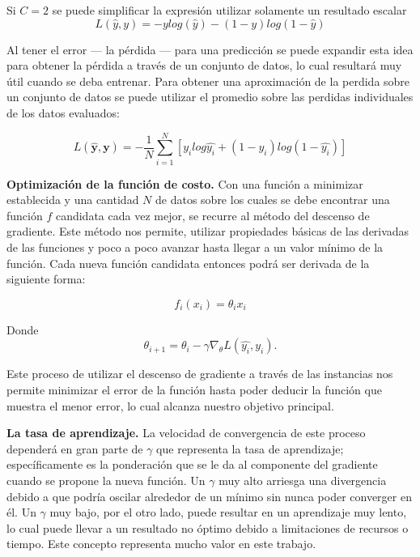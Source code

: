 Si $C = 2$ se puede simplificar la expresión utilizar solamente un resultado escalar
\begin{equation}
\label{eq:bincrossentropy}
L(\hat{y}, y) = - y log \left( \hat{y} \right) - \left(1 - y\right) log \left( 1 - \hat{y} \right)
\end{equation}

Al tener el error --- la pérdida --- para una predicción se puede expandir esta idea para obtener la pérdida a través de un conjunto de datos, lo cual resultará muy útil cuando se deba entrenar. Para obtener una aproximación de la perdida sobre un conjunto de datos se puede utilizar el promedio sobre las perdidas individuales de los datos evaluados:

\[ L(\mathbf{\hat{y}}, \mathbf{y}) = - \frac{1}{N} \sum_{i = 1}^{N} [y_i log\hat{y_i} + (1 - y_i)log(1 - \hat{y_i})] \]

\textbf{Optimización de la función de costo.} Con una función a minimizar establecida y una cantidad $N$ de datos sobre los cuales se debe encontrar una función $f$ candidata cada vez mejor, se recurre al método del descenso de gradiente. Este método nos permite, utilizar propiedades básicas de las derivadas de las funciones y poco a poco avanzar hasta llegar a un valor mínimo de la función. Cada nueva función candidata entonces podrá ser derivada de la siguiente forma:

\[ f_i(x_i) = \theta_i x_i \]

Donde
\begin{equation}
\label{eq:sgdupdate}
\theta_{i + 1} = \theta_{i} - \gamma \nabla_{\theta} L(\hat{y_i}, y_i).
\end{equation}

Este proceso de utilizar el descenso de gradiente a través de las instancias nos permite  minimizar el error de la función hasta poder deducir la función que muestra el menor error, lo cual alcanza nuestro objetivo principal.

\textbf{La \gls{tasa de aprendizaje}.} La velocidad de convergencia de este proceso dependerá en gran parte de $\gamma$ que representa la tasa de aprendizaje; específicamente es la ponderación que se le da al componente del gradiente cuando se propone la nueva función. Un $\gamma$ muy alto arriesga una divergencia debido a que podría oscilar alrededor de un mínimo sin nunca poder converger en él. Un $\gamma$ muy bajo, por el otro lado, puede resultar en un aprendizaje muy lento, lo cual puede llevar a un resultado no óptimo debido a limitaciones de recursos o tiempo. Este concepto representa mucho valor en este trabajo.

